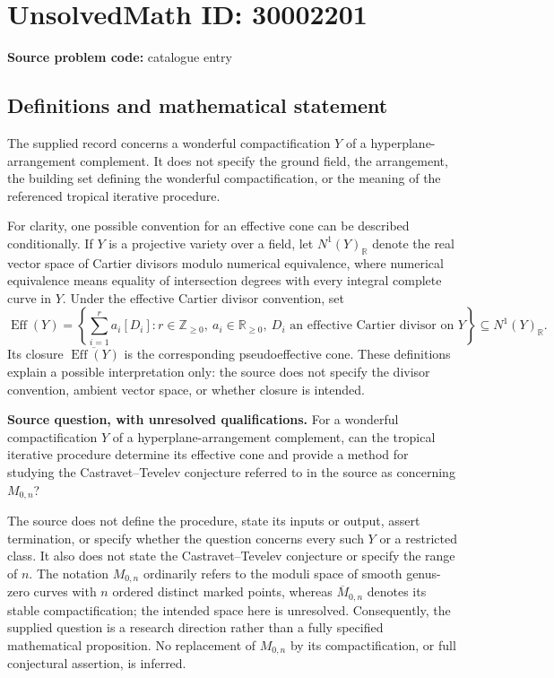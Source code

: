 \documentclass[11pt]{article}
\newcommand{\Z}{\mathbb{Z}}
\newcommand{\R}{\mathbb{R}}
\begin{document}
\section*{UnsolvedMath ID: 30002201}
\textbf{Source problem code:} catalogue entry
\subsection{Definitions and mathematical statement}
The supplied record concerns a wonderful compactification \(Y\) of a hyperplane-arrangement complement. It does not specify the ground field, the arrangement, the building set defining the wonderful compactification, or the meaning of the referenced tropical iterative procedure.

For clarity, one possible convention for an effective cone can be described conditionally. If \(Y\) is a projective variety over a field, let \(N^1(Y)_{\R}\) denote the real vector space of Cartier divisors modulo numerical equivalence, where numerical equivalence means equality of intersection degrees with every integral complete curve in \(Y\). Under the effective Cartier divisor convention, set
\[
\operatorname{Eff}(Y)=\left\{\sum_{i=1}^{r} a_i[D_i] : r\in\Z_{\geq 0},\ a_i\in\R_{\geq 0},\ D_i\text{ an effective Cartier divisor on }Y\right\}\subseteq N^1(Y)_{\R}.
\]
Its closure \(\overline{\operatorname{Eff}(Y)}\) is the corresponding pseudoeffective cone. These definitions explain a possible interpretation only: the source does not specify the divisor convention, ambient vector space, or whether closure is intended.

\textbf{Source question, with unresolved qualifications.} For a wonderful compactification \(Y\) of a hyperplane-arrangement complement, can the tropical iterative procedure determine its effective cone and provide a method for studying the Castravet--Tevelev conjecture referred to in the source as concerning \(M_{0,n}\)?

The source does not define the procedure, state its inputs or output, assert termination, or specify whether the question concerns every such \(Y\) or a restricted class. It also does not state the Castravet--Tevelev conjecture or specify the range of \(n\). The notation \(M_{0,n}\) ordinarily refers to the moduli space of smooth genus-zero curves with \(n\) ordered distinct marked points, whereas \(\overline{M}_{0,n}\) denotes its stable compactification; the intended space here is unresolved. Consequently, the supplied question is a research direction rather than a fully specified mathematical proposition. No replacement of \(M_{0,n}\) by its compactification, or full conjectural assertion, is inferred.
\end{document}
